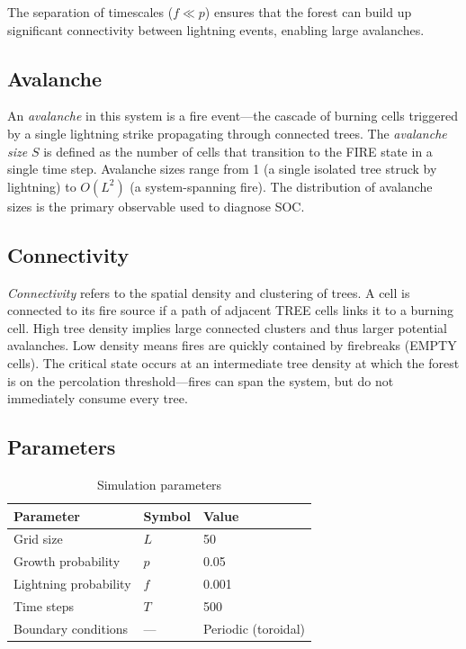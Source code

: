 \documentclass[12pt, a4paper]{article}
\begin{document}
The separation of timescales ($f \ll p$) ensures that the forest can build up
significant connectivity between lightning events, enabling large avalanches.

\subsection{Avalanche}

An \emph{avalanche} in this system is a fire event—the cascade of burning cells
triggered by a single lightning strike propagating through connected trees. The
\emph{avalanche size} $S$ is defined as the number of cells that transition to the
FIRE state in a single time step. Avalanche sizes range from 1 (a single isolated
tree struck by lightning) to $O(L^2)$ (a system-spanning fire). The distribution
of avalanche sizes is the primary observable used to diagnose SOC.

\subsection{Connectivity}

\emph{Connectivity} refers to the spatial density and clustering of trees. A cell
is connected to its fire source if a path of adjacent TREE cells links it to a
burning cell. High tree density implies large connected clusters and thus larger
potential avalanches. Low density means fires are quickly contained by firebreaks
(EMPTY cells). The critical state occurs at an intermediate tree density at which
the forest is on the percolation threshold—fires can span the system, but do not
immediately consume every tree.

\subsection{Parameters}

\begin{table}[H]
\centering
\caption{Simulation parameters}
\begin{tabular}{lll}
\toprule
\textbf{Parameter} & \textbf{Symbol} & \textbf{Value} \\
\midrule
Grid size           & $L$     & 50 \\
Growth probability  & $p$     & 0.05 \\
Lightning probability & $f$   & 0.001 \\
Time steps          & $T$     & 500 \\
Boundary conditions & ---     & Periodic (toroidal) \\
\bottomrule
\end{tabular}
\label{tab:params}
\end{table}
\end{document}
